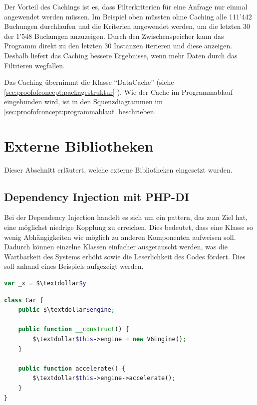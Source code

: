 Der Vorteil des Cachings ist es, dass Filterkriterien für eine Anfrage nur einmal angewendet werden müssen. Im Beispiel oben müssten ohne Caching alle 111'442 Buchungen durchlaufen und die Kriterien angewendet werden, um die letzten 30 der 1'548 Buchungen anzuzeigen. Durch den Zwischenspeicher kann das Programm direkt zu den letzten 30 Instanzen iterieren und diese anzeigen. Deshalb liefert das Caching bessere Ergebnisse, wenn mehr Daten durch das Filtrieren wegfallen.

Das Caching übernimmt die Klasse "`DataCache"' (siehe \cref{sec:proofofconcept:packagestruktur} ). Wie der Cache im Programmablauf eingebunden wird, ist in den Squenzdiagrammen im \cref{sec:proofofconcept:programmablauf}  beschrieben.

\section{Externe Bibliotheken}
\label{sec:proofofconcept:externebibliotheken}
Dieser Abschnitt erläutert, welche externe Bibliotheken eingesetzt wurden.

\subsection{Dependency Injection mit PHP-DI}
\label{sec:proofofconcept:dependency-injection}
Bei der Dependency Injection handelt es sich um ein \gls{pattern},
das zum Ziel hat, eine möglichst niedrige Kopplung zu erreichen. Dies bedeutet, dass eine Klasse so wenig Abhängigkeiten wie möglich zu anderen Komponenten aufweisen soll. Dadurch können einzelne Klassen einfacher ausgetauscht werden, was die Wartbarkeit des Systems erhöht sowie die Leserlichkeit des Codes fördert. Dies soll anhand eines Beispiels aufgezeigt werden.

\begin{lstlisting}[language=php]
var _x = $\textdollar$y
\end{lstlisting}

\begin{lstlisting}[language=php]
class Car {
	public $\textdollar$engine;
	
	public function __construct() {
		$\textdollar$this->engine = new V6Engine();
	}
	
	public function accelerate() {
		$\textdollar$this->engine->accelerate();
	}
}
\end{lstlisting}

